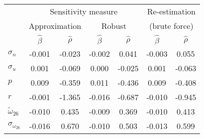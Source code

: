 \begin{tabular}{l*{6}{c}} \toprule 
& \multicolumn{4}{c}{Sensitivity measure} & \multicolumn{2}{c}{Re-estimation} \\ \cmidrule(lr){2-5}   
& \multicolumn{2}{c}{Approximation} & \multicolumn{2}{c}{Robust} & \multicolumn{2}{c}{(brute force)} \\ \cmidrule(lr){2-3} \cmidrule(lr){4-5} \cmidrule(lr){6-7}  
& $\hat{\beta}$ & $\hat{\rho}$ & $\hat{\beta}$ & $\hat{\rho}$ & $\hat{\beta}$ & $\hat{\rho}$ \\ \cmidrule(lr){2-7} 
  $\sigma_{n}$ & -0.001 & -0.023 & -0.002 & 0.041 & -0.003 & 0.055 \\ 
  $\sigma_{u}$ & 0.001 & -0.069 & 0.000 & -0.025 & 0.001 & -0.063 \\ 
  $p$ & 0.009 & -0.359 & 0.011 & -0.436 & 0.009 & -0.408 \\ 
  $r$ & -0.001 & -1.365 & -0.016 & -0.687 & -0.010 & -0.945 \\ 
  $\tilde{\omega}_{26}$ & -0.010 & 0.435 & -0.009 & 0.369 & -0.010 & 0.413 \\ 
  $\sigma_{\omega_{26}}$ & -0.016 & 0.670 & -0.010 & 0.503 & -0.013 & 0.599 \\ 
 \bottomrule 
 \end{tabular}